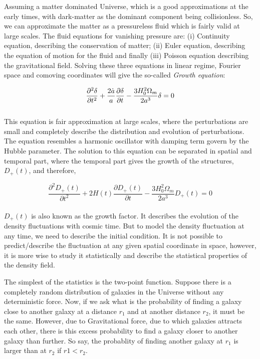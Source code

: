 Assuming a matter dominated Universe, which is a good approximations at the
early times, with dark-matter as the dominant component being collisionless. 
So, we can approximate the matter as a pressureless fluid which is fairly 
valid at large scales. The fluid equations for vanishing pressure are: 
(i) Continuity equation, describing the conservation of matter; (ii) Euler
equation, describing the equation of motion for the fluid and finally (iii) 
Poisson equation describing the gravitational field. Solving these three 
equations in linear regime, Fourier space and comoving coordinates will give
the so-called {\it Growth equation}:

\begin{equation}
\centering
\dfrac{\partial^2\delta}{\partial t^2} + \dfrac{2\dot{a}}{a} 
		\dfrac{\partial\delta}{\partial t}
		- \dfrac{3H_0^2 \Omega_m}{2a^3} \delta = 0
\end{equation}
\\
This equation is fair approximation at large scales, where the perturbations
are small and completely describe the distribution and evolution of perturbations. 
The equation resembles a harmonic oscillator with damping
term govern by the Hubble parameter. The solution to this equation can be 
separated in spatial and temporal part, where the temporal part gives the 
growth of the structures, $D_+(t)$, and therefore,

\begin{equation}
	\dfrac{\partial^2 D_+(t)}{\partial t^2} + 2 H(t)
		\dfrac{\partial D_+(t)}{\partial t}
		- \dfrac{3H_0^2 \Omega_m}{2a^3} D_+(t) = 0
\end{equation}
\\
$D_+(t)$ is also known as the growth factor. It describes the evolution of the
density fluctuations with cosmic time. But to model the density fluctuation 
at any time, we need to describe the initial condition. It is not possible
to predict/describe the fluctuation at any given spatial coordinate in space,
however, it is more wise to study it statistically and describe the statistical
properties of the density field. 

The simplest of the statistics is the two-point function. Suppose there is a 
completely random distribution of galaxies in the Universe without any deterministic 
force. Now, if we ask what is the probability of finding a galaxy close to another
galaxy at a distance $r_1$ and at another distance $r_2$, it must be the same. 
However, due to Gravitational force, due to which galaxies attracts each other, 
there is this excess probability to find a galaxy closer to another galaxy than
further. So say, the probablity of finding another galaxy at $r_1$ is larger than
at $r_2$ if $r1<r_2$.

